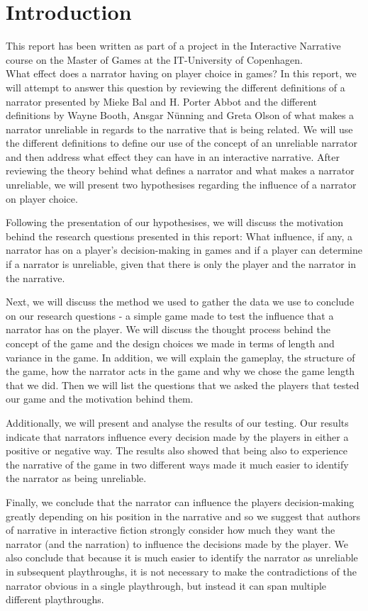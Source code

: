 \section{Introduction}
\label{Introduction}

This report has been written as part of a project in the Interactive Narrative course on the Master of Games at the IT-University of Copenhagen.\\

What effect does a narrator having on player choice in games? In this report, we will attempt to answer this question by reviewing the different definitions of a narrator presented by Mieke Bal and H. Porter Abbot and the different definitions by Wayne Booth, Ansgar N\"unning and Greta Olson of what makes a narrator unreliable in regards to the narrative that is being related. We will use the different definitions to define our use of the concept of an unreliable narrator and then address what effect they can have in an interactive narrative. After reviewing the theory behind what defines a narrator and what makes a narrator unreliable, we will present two hypothesises regarding the influence of a narrator on player choice.

Following the presentation of our hypothesises, we will discuss the motivation behind the research questions presented in this report: What influence, if any, a narrator has on a player's decision-making in games and if a player can determine if a narrator is unreliable, given that there is only the player and the narrator in the narrative. 

Next, we will discuss the method we used to gather the data we use to conclude on our research questions - a simple game made to test the influence that a narrator has on the player. We will discuss the thought process behind the concept of the game and the design choices we made in terms of length and variance in the game. In addition, we will explain the gameplay, the structure of the game, how the narrator acts in the game and why we chose the game length that we did. Then we will list the questions that we asked the players that tested our game and the motivation behind them.

Additionally, we will present and analyse the results of our testing. Our results indicate that narrators influence every decision made by the players in either a positive or negative way. The results also showed that being also to experience the narrative of the game in two different ways made it much easier to identify the narrator as being unreliable.

Finally, we conclude that the narrator can influence the players decision-making greatly depending on his position in the narrative and so we suggest that authors of narrative in interactive fiction strongly consider how much they want the narrator (and the narration) to influence the decisions made by the player. We also conclude that because it is much easier to identify the narrator as unreliable in subsequent playthroughs, it is not necessary to make the contradictions of the narrator obvious in a single playthrough, but instead it can span multiple different playthroughs.